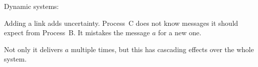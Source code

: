 \documentclass[10pt, xcolor={usenames, dvipsnames}]{beamer}
\newcommand{\xmark}{\ding{55}}
\newcommand{\NO}[1]{\textcolor{red}{#1}}
\begin{document}
\begin{frame}{Dynamic systems: \NO{\xmark}}
  
  \begin{minipage}{0.24\textwidth}
    \centering
        
  \end{minipage}
  \begin{minipage}{0.24\textwidth}
    \centering
        
  \end{minipage}
  \begin{minipage}{0.24\textwidth}
    \centering
        
  \end{minipage}
  \begin{minipage}{0.24\textwidth}
    \centering
    
  \end{minipage}
  
  \vspace{2em}

  Adding a link adds uncertainty. Process~C does not know messages it should
  expect from Process~B. It mistakes the message $a$ for a new one.

  Not only it delivers $a$ multiple times, but this has cascading effects over
  the whole system.

\end{frame}
\end{document}
